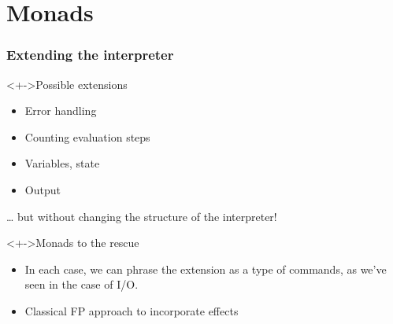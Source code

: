 \documentclass{beamer}
\begin{document}
\section{Monads}
\begin{frame}[fragile]
  \frametitle{Extending the interpreter}
  \begin{block}<+->{Possible extensions}
    \begin{minipage}{0.45\linewidth}
      \begin{itemize}
      \item Error handling
      \item Counting evaluation steps
      \item Variables, state
      \item Output
      \end{itemize}
    \end{minipage}
    \begin{minipage}{0.45\linewidth}
    \end{minipage}

    \dots{} but without changing the structure of the interpreter!
  \end{block}
  \begin{block}<+->{Monads to the rescue}
    \begin{itemize}
    \item In each case, we can phrase the extension as a type of
      commands, as we've seen in the case of I/O.
    \item Classical FP approach to incorporate effects
    \end{itemize}
  \end{block}
\end{frame}
\end{document}
